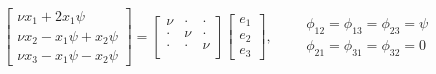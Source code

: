 \begin{equation}\label{eq:sys-Eaton2014-simple}
\left[\begin{array}{l}
\nu x_1 + 2 x_1 \psi \\
\nu x_2 -   x_1 \psi + x_2 \psi \\
\nu x_3 -   x_1 \psi - x_2 \psi
\end{array}\right]
=
\left[\begin{array}{ccc}
\nu  & \cdot & \cdot \\
\cdot &  \nu  & \cdot \\
\cdot & \cdot &  \nu  \\
\end{array}\right]
\left[\begin{array}{c}
e_1 \\
e_2 \\
e_3
\end{array}\right]
,\qquad
\begin{array}{c}
\phi_{12} = \phi_{13} = \phi_{23} = \psi\\
\phi_{21} = \phi_{31} = \phi_{32} = 0
\end{array}
\end{equation}
